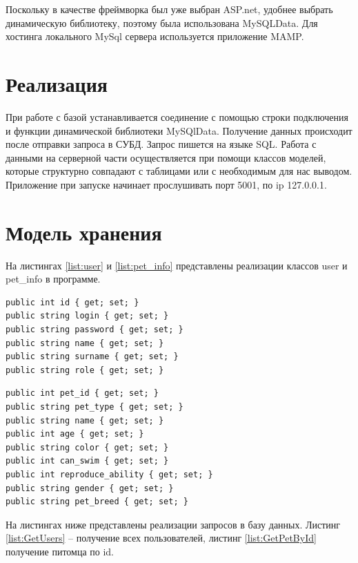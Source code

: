 \hspace{0.6cm} Поскольку в качестве фреймворка был уже выбран ASP.net, удобнее выбрать динамическую библиотеку, поэтому была использована MySQLData. Для хостинга локального MySql сервера используется приложение MAMP.

\section{Реализация}

\hspace{0.6cm} При работе с базой устанавливается соединение с помощью строки подключения и функции динамической библиотеки MySQlData. Получение данных происходит после отправки запроса в СУБД. Запрос пишется на языке SQL. Работа с данными на серверной части осуществляется при помощи классов моделей, которые структурно совпадают с таблицами или с необходимым для нас выводом. Приложение при запуске начинает прослушивать порт 5001, по ip 127.0.0.1.

\section{Модель хранения}

На листингах \ref{list:user} и \ref{list:pet_info} представлены реализации классов user и pet\_info в программе.

\begin{lstlisting}[caption=класс User, label=list:user]
public int id { get; set; }
public string login { get; set; }
public string password { get; set; }
public string name { get; set; }
public string surname { get; set; }
public string role { get; set; }
\end{lstlisting}

\begin{lstlisting}[caption=класс pet\_info, label=list:pet_info]
public int pet_id { get; set; }
public string pet_type { get; set; }
public string name { get; set; } 
public int age { get; set; } 
public string color { get; set; } 
public int can_swim { get; set; } 
public int reproduce_ability { get; set; } 
public string gender { get; set; } 
public string pet_breed { get; set; } 
\end{lstlisting}

На листингах ниже представлены реализации запросов в базу данных.
Листинг \ref{list:GetUsers} – получение всех пользователей, листинг \ref{list:GetPetById} получение питомца по id.

